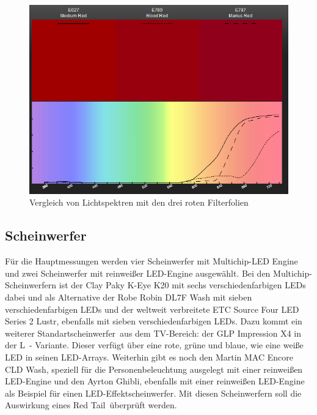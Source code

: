 \begin{figure}[H]     %
\centering
\includegraphics[width=1.0\textwidth]{bilder/rottons} 
\caption {Vergleich von Lichtspektren mit den drei roten Filterfolien\protect\footnotemark}\label{b_rottons}
\end{figure}

\subsection{Scheinwerfer}
Für die Hauptmessungen werden vier Scheinwerfer mit Multichip-LED Engine und zwei Scheinwerfer mit reinweißer LED-Engine ausgewählt. Bei den Multichip- Scheinwerfern ist der Clay Paky K-Eye K20 mit sechs verschiedenfarbigen LEDs dabei und als Alternative der Robe Robin DL7F Wash mit sieben verschiedenfarbigen LEDs und der weltweit verbreitete ETC Source Four LED Series 2 Lustr, ebenfalls mit sieben verschiedenfarbigen LEDs. Dazu kommt ein weiterer \glqq Standartscheinwerfer\grqq\ aus dem TV-Bereich: der GLP Impression X4 in der \glqq L\grqq\ - Variante. Dieser verfügt über eine rote, grüne und blaue, wie eine weiße LED in seinen LED-Arrays. Weiterhin gibt es noch den Martin MAC Encore CLD Wash, speziell für die Personenbeleuchtung ausgelegt mit einer reinweißen LED-Engine und den Ayrton Ghibli, ebenfalls mit einer reinweißen LED-Engine als Beispiel für einen LED-Effektscheinwerfer.
Mit diesen Scheinwerfern soll die Auswirkung eines \glqq Red Tail\grqq\ überprüft werden.

